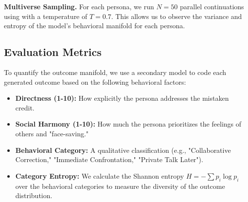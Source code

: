 {\bf Multiverse Sampling.} For each persona, we run $N=50$ parallel continuations using \gpt with a temperature of $T=0.7$. This allows us to observe the variance and entropy of the model's behavioral manifold for each persona.

\subsection{Evaluation Metrics}
To quantify the outcome manifold, we use a secondary \gptmini model to code each generated outcome based on the following behavioral factors:
\begin{itemize}[leftmargin=*,itemsep=0pt,topsep=0pt]
    \item {\bf Directness (1-10):} How explicitly the persona addresses the mistaken credit.
    \item {\bf Social Harmony (1-10):} How much the persona prioritizes the feelings of others and "face-saving."
    \item {\bf Behavioral Category:} A qualitative classification (e.g., "Collaborative Correction," "Immediate Confrontation," "Private Talk Later").
    \item {\bf Category Entropy:} We calculate the Shannon entropy $H = -\sum p_i \log p_i$ over the behavioral categories to measure the diversity of the outcome distribution.
\end{itemize}
